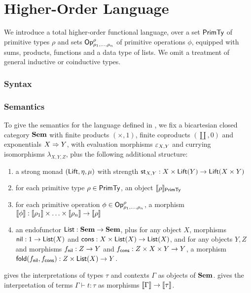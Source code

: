 \section{Higher-Order Language}

We introduce a total higher-order functional language, over a set $\mathsf{PrimTy}$ of primitive types $\rho$ and sets
$\mathsf{Op}^\rho_{\rho_1,\ldots,\rho_n}$ of primitive operations $\phi$, equipped with sums, products, functions
and a data type of lists. We omit a treatment of general inductive or coinductive types.

\subsubsection{Syntax}
\label{sec:language:syntax}




\subsubsection{Semantics}
\label{sec:language:semantics}



To give the semantics for the language defined in , we fix a bicartesian closed
category $\mathbf{Sem}$ with finite products $(\times, 1)$, finite coproducts $(\coprod, 0)$ and exponentials
$X \Rightarrow Y$, with evaluation morphisms $\varepsilon_{X,Y}$ and currying isomorphisms $\lambda_{X,Y,Z}$,
plus the following additional structure:
\begin{enumerate}
\item a strong monad $(\mathsf{Lift}, \eta, \mu)$ with strength $\mathsf{st}_{X,Y}: X \times \mathsf{Lift}(Y) \to \mathsf{Lift}(X
\times Y)$
\item for each primitive type $\rho \in \mathsf{PrimTy}$, an object $\llbracket \rho \rrbracket_{\mathsf{PrimTy}}$
\item for each primitive operation $\phi \in \mathsf{Op}^\rho_{\rho_1,\ldots,\rho_n}$, a morphism $\llbracket \phi \rrbracket:
\llbracket \rho_1 \rrbracket \times \ldots \times \llbracket \rho_n \rrbracket \to \llbracket \rho \rrbracket$
\item an endofunctor $\mathsf{List}: \mathbf{Sem} \to \mathbf{Sem}$, plus for any object $X$, morphisms $\mathsf{nil}: 1 \to \mathsf{List}(X)$ and
$\mathsf{cons}: X \times \mathsf{List}(X) \to \mathsf{List}(X)$, and for any objects $Y, Z$ and morphisms $f_{\mathsf{nil}}: Z \to Y$ and
$f_{\mathsf{cons}}: Z \times X \times Y \to Y$, a morphism $\mathsf{fold}(f_{\mathsf{nil}},f_{\mathsf{cons}}): Z \times \mathsf{List}(X) \to Y$.
\end{enumerate}

 gives the interpretations of types $\tau$ and contexts $\Gamma$ as objects of $\mathbf{Sem}$.
 gives the interpretation of terms $\Gamma \vdash t: \tau$ as morphisms $\llbracket \Gamma \rrbracket
\to \llbracket \tau \rrbracket$.
